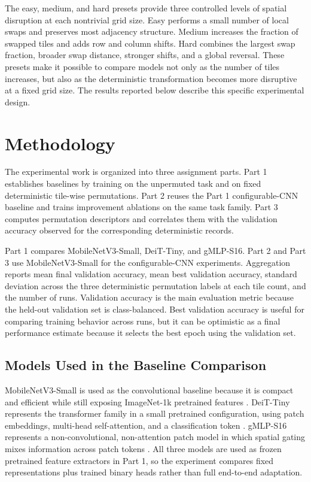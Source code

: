 \documentclass[12pt]{article}
\begin{document}
The easy, medium, and hard presets provide three controlled levels of spatial disruption at each nontrivial grid size. Easy performs a small number of local swaps and preserves most adjacency structure. Medium increases the fraction of swapped tiles and adds row and column shifts. Hard combines the largest swap fraction, broader swap distance, stronger shifts, and a global reversal. These presets make it possible to compare models not only as the number of tiles increases, but also as the deterministic transformation becomes more disruptive at a fixed grid size. The results reported below describe this specific experimental design.

\section{Methodology}

The experimental work is organized into three assignment parts. Part 1 establishes baselines by training on the unpermuted task and on fixed deterministic tile-wise permutations. Part 2 reuses the Part 1 configurable-CNN baseline and trains improvement ablations on the same task family. Part 3 computes permutation descriptors and correlates them with the validation accuracy observed for the corresponding deterministic records.

Part 1 compares MobileNetV3-Small, DeiT-Tiny, and gMLP-S16. Part 2 and Part 3 use MobileNetV3-Small for the configurable-CNN experiments. Aggregation reports mean final validation accuracy, mean best validation accuracy, standard deviation across the three deterministic permutation labels at each tile count, and the number of runs. Validation accuracy is the main evaluation metric because the held-out validation set is class-balanced. Best validation accuracy is useful for comparing training behavior across runs, but it can be optimistic as a final performance estimate because it selects the best epoch using the validation set.

\subsection{Models Used in the Baseline Comparison}

MobileNetV3-Small is used as the convolutional baseline because it is compact and efficient while still exposing ImageNet-1k pretrained features \citep{howard2019searching}. DeiT-Tiny represents the transformer family in a small pretrained configuration, using patch embeddings, multi-head self-attention, and a classification token \citep{touvron2021deit}. gMLP-S16 represents a non-convolutional, non-attention patch model in which spatial gating mixes information across patch tokens \citep{liu2021pay}. All three models are used as frozen pretrained feature extractors in Part 1, so the experiment compares fixed representations plus trained binary heads rather than full end-to-end adaptation.
\end{document}

